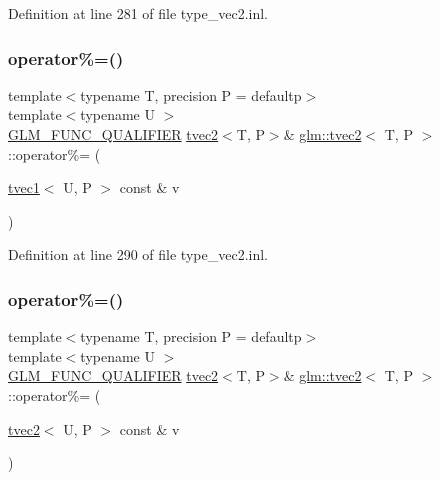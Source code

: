 Definition at line 281 of file type\+\_\+vec2.\+inl.

\mbox{\label{structglm_1_1tvec2_aea6f1233a9ef7b8c12cee037fa5f7b9d}} 
\subsubsection{\texorpdfstring{operator\%=()}{operator\%=()}\hspace{0.1cm}{\footnotesize\ttfamily [5/6]}}
{\footnotesize\ttfamily template$<$typename T, precision P = defaultp$>$ \\
template$<$typename U $>$ \\
\mbox{\hyperlink{setup_8hpp_a33fdea6f91c5f834105f7415e2a64407}{G\+L\+M\+\_\+\+F\+U\+N\+C\+\_\+\+Q\+U\+A\+L\+I\+F\+I\+ER}} \mbox{\hyperlink{structglm_1_1tvec2}{tvec2}}$<$T, P$>$\& \mbox{\hyperlink{structglm_1_1tvec2}{glm\+::tvec2}}$<$ T, P $>$\+::operator\%= (\begin{DoxyParamCaption}\item[{\mbox{\hyperlink{structglm_1_1tvec1}{tvec1}}$<$ U, P $>$ const \&}]{v }\end{DoxyParamCaption})}



Definition at line 290 of file type\+\_\+vec2.\+inl.

\mbox{\label{structglm_1_1tvec2_aaf4c73ee8e801c26093def1d49df1df1}} 
\subsubsection{\texorpdfstring{operator\%=()}{operator\%=()}\hspace{0.1cm}{\footnotesize\ttfamily [6/6]}}
{\footnotesize\ttfamily template$<$typename T, precision P = defaultp$>$ \\
template$<$typename U $>$ \\
\mbox{\hyperlink{setup_8hpp_a33fdea6f91c5f834105f7415e2a64407}{G\+L\+M\+\_\+\+F\+U\+N\+C\+\_\+\+Q\+U\+A\+L\+I\+F\+I\+ER}} \mbox{\hyperlink{structglm_1_1tvec2}{tvec2}}$<$T, P$>$\& \mbox{\hyperlink{structglm_1_1tvec2}{glm\+::tvec2}}$<$ T, P $>$\+::operator\%= (\begin{DoxyParamCaption}\item[{\mbox{\hyperlink{structglm_1_1tvec2}{tvec2}}$<$ U, P $>$ const \&}]{v }\end{DoxyParamCaption})}



